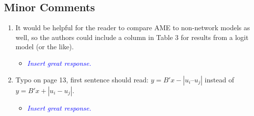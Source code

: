\subsection{Minor Comments}

\begin{enumerate}
	\item It would be helpful for the reader to compare AME to non-network models as well, so the authors could include a column in Table 3 for results from a logit model (or the like). 
	\begin{itemize}
		\item \textcolor{blue}{ \emph{
		Insert great response.
		}}
	\end{itemize}		
	\item Typo on page 13, first sentence should read: $y = B'x - |u_i – u_j|$ instead of $y = B'x + |u_i - u_j|$.
	\begin{itemize}
		\item \textcolor{blue}{ \emph{
		Insert great response.
		}}
	\end{itemize}		
\end{enumerate}

